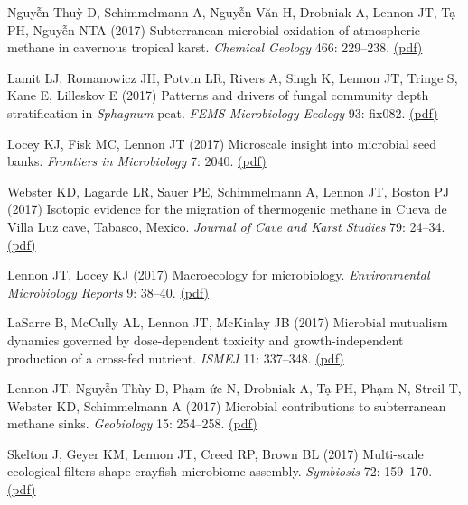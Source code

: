 \documentclass[11pt]{article}
\begin{document}
\begin{etaremune}
\item Nguyễn-Thuỳ D, Schimmelmann A, Nguyễn-Văn H, Drobniak A, Lennon JT, Tạ PH, Nguyễn NTA (2017) Subterranean microbial oxidation of atmospheric methane in cavernous tropical karst. \textit{Chemical Geology} 466: 229--238. \href{https://lennonlab.github.io/assets/publications/Nguyen-Thuy_etal_2017.pdf}{(pdf)}

\item Lamit LJ, Romanowicz JH, Potvin LR, Rivers A, Singh K, Lennon JT, Tringe S, Kane E, Lilleskov E (2017) Patterns and drivers of fungal community depth stratification in \textit{Sphagnum} peat. \textit{FEMS Microbiology Ecology} 93: fix082. \href{https://lennonlab.github.io/assets/publications/Lamit_etal_2017.pdf}{(pdf)}

\item Locey KJ, Fisk MC, Lennon JT (2017) Microscale insight into microbial seed banks. \textit{Frontiers in Microbiology} 7: 2040. \href{https://lennonlab.github.io/assets/publications/Locey_etal_2017.pdf}{(pdf)}

\item Webster KD, Lagarde LR, Sauer PE, Schimmelmann A, Lennon JT, Boston PJ (2017) Isotopic evidence for the migration of thermogenic methane in Cueva de Villa Luz cave, Tabasco, Mexico. \textit{Journal of Cave and Karst Studies} 79: 24–34. \href{https://lennonlab.github.io/assets/publications/Webster_etal_2017.pdf}{(pdf)}

\item Lennon JT, Locey KJ (2017) Macroecology for microbiology. \textit{Environmental Microbiology Reports} 9: 38–40. \href{https://lennonlab.github.io/assets/publications/Lennon_Locey_2017.pdf}{(pdf)}

\item LaSarre B, McCully AL, Lennon JT, McKinlay JB (2017) Microbial mutualism dynamics governed by dose-dependent toxicity and growth-independent production of a cross-fed nutrient. \textit{ISMEJ} 11: 337–348. \href{https://lennonlab.github.io/assets/publications/LaSarre_etal_2017.pdf}{(pdf)}

\item Lennon JT, Nguyễn Thùy D, Phạm \DJ{}ức N, Drobniak A, Tạ PH, Phạm N\DJ{}, Streil T, Webster KD, Schimmelmann A (2017) Microbial contributions to subterranean methane sinks. \textit{Geobiology} 15: 254--258. \href{https://lennonlab.github.io/assets/publications/Lennon_etal_2017.pdf}{(pdf)}

\item Skelton J, Geyer KM, Lennon JT, Creed RP, Brown BL (2017) Multi-scale ecological filters shape crayfish microbiome assembly. \textit{Symbiosis} 72: 159–170. \href{https://lennonlab.github.io/assets/publications/Skelton_etal_2017.pdf}{(pdf)}


\end{etaremune}
\end{document}
